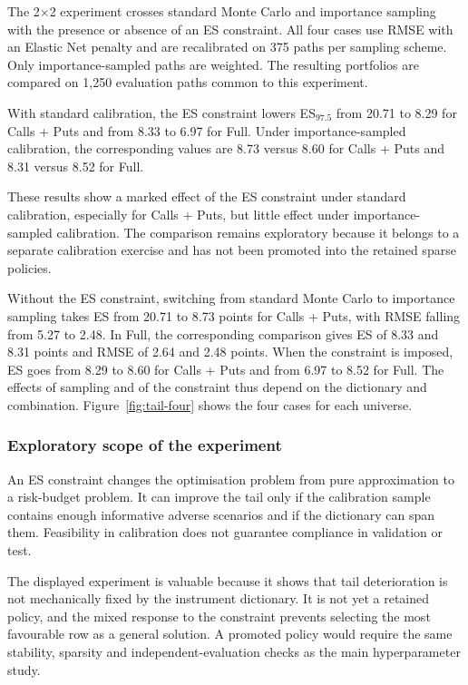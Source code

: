 The 2$\times$2 experiment crosses standard Monte Carlo and importance sampling with the presence or absence of an ES constraint. All four cases use RMSE with an Elastic Net penalty and are recalibrated on 375 paths per sampling scheme. Only importance-sampled paths are weighted. The resulting portfolios are compared on 1,250 evaluation paths common to this experiment.

With standard calibration, the ES constraint lowers ES$_{97.5}$ from 20.71 to 8.29 for Calls + Puts and from 8.33 to 6.97 for Full. Under importance-sampled calibration, the corresponding values are 8.73 versus 8.60 for Calls + Puts and 8.31 versus 8.52 for Full.

These results show a marked effect of the ES constraint under standard calibration, especially for Calls + Puts, but little effect under importance-sampled calibration. The comparison remains exploratory because it belongs to a separate calibration exercise and has not been promoted into the retained sparse policies.

Without the ES constraint, switching from standard Monte Carlo to importance sampling takes ES from 20.71 to 8.73 points for Calls + Puts, with RMSE falling from 5.27 to 2.48. In Full, the corresponding comparison gives ES of 8.33 and 8.31 points and RMSE of 2.64 and 2.48 points. When the constraint is imposed, ES goes from 8.29 to 8.60 for Calls + Puts and from 6.97 to 8.52 for Full. The effects of sampling and of the constraint thus depend on the dictionary and combination. Figure~\ref{fig:tail-four} shows the four cases for each universe.


\subsubsection*{Exploratory scope of the experiment}

An ES constraint changes the optimisation problem from pure approximation to a
risk-budget problem. It can improve the tail only if the calibration sample
contains enough informative adverse scenarios and if the dictionary can span
them. Feasibility in calibration does not guarantee compliance in validation
or test.

The displayed experiment is valuable because it shows that tail deterioration
is not mechanically fixed by the instrument dictionary. It is not yet a
retained policy, and the mixed response to the constraint prevents selecting
the most favourable row as a general solution. A promoted policy would require
the same stability, sparsity and independent-evaluation checks as the main
hyperparameter study.

